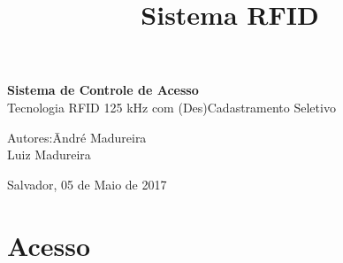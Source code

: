 \documentclass[a4paper, 12pt]{article}
\title{Sistema RFID}
\begin{document}

\begin{titlepage}
	\begin{center}


\vspace{10pt}
        
        \vspace{85pt}
        
		\textbf{\LARGE{Sistema de Controle de Acesso}}\\
		\large{Tecnologia RFID 125 kHz com (Des)Cadastramento Seletivo}
		\vspace{8cm}
		
	\end{center}
	
	\begin{flushleft}
		\begin{tabbing}
			Autores:\qquad\= André Madureira\\
			\>Luiz Madureira\\
		
	\end{tabbing}		  
	\end{flushleft}
	
	\begin{center}
		\vspace{\fill}
		Salvador, 05 de Maio de 2017
	\end{center}
\end{titlepage}
\newpage
\tableofcontents
\thispagestyle{empty}

\newpage
{}

\section{Acesso}
\end{document}
